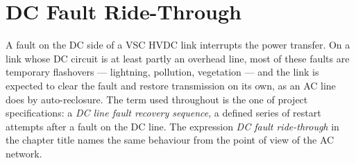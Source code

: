 \section{DC Fault Ride-Through}
\label{sec:dc-fault}

A fault on the DC side of a VSC HVDC link interrupts the power transfer. On a
link whose DC circuit is at least partly an overhead line, most of these
faults are temporary flashovers --- lightning, pollution, vegetation --- and
the link is expected to clear the fault and restore transmission on its own,
as an AC line does by auto-reclosure. The term used throughout is the one of
project specifications: a \emph{DC line fault recovery sequence}, a defined
series of restart attempts after a fault on the DC line. The expression
\emph{DC fault ride-through} in the chapter title names the same behaviour
from the point of view of the AC network.

